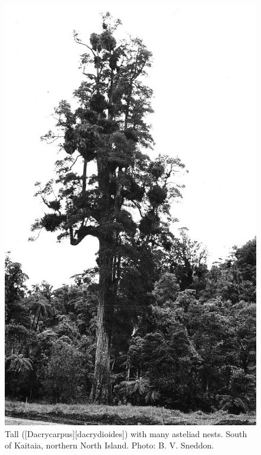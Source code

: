 \begin{figure}[t]
	\begin{minipage}[t]{\textwidth}
		\begin{minipage}[t]{(\textwidth-\fgap) * \real{0.446}}
			\centering
			\includegraphics[width=\textwidth]{graphics/figure39kahikatea.jpg}
			\caption[Tall kahikatea with many asteliad nests]{Tall  ([Dacrycarpus][dacrydioides]) with many asteliad nests.
			South of Kaitaia, northern North Island.
			Photo: B. V. Sneddon.}%

\end{minipage}
\end{minipage}
\end{figure}
